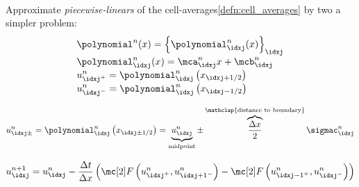 \begin{defnbox}\nospacing
    \begin{defn}\label{defn:approximate_reconstruction}\leavevmode\\
        \begin{minipage}{0.5\textwidth}
            Approximate \textit{piecewise-linears} of the cell-averages\cref{defn:cell_averages} by
            two a simpler problem:
        \begin{align*}
          &\polynomial^{n}(x)=\left\{\polynomial_{\idxj}^{n}(x)\right\}_{\idxj}\\[-1\jot]
          &\polynomial_{\idxj}^{n}(x)=\mca_{\idxj}^{n}x+\mcb_{\idxj}^{n}\\[-1\jot]
          &u_{\idxj^{+}}^{n}=\polynomial_{\idxj}^{n}\left(x_{\idxj+1/2}\right)\\[-1\jot]
          &u_{\idxj^{-}}^{n}=\polynomial_{\idxj}^{n}\left(x_{\idxj-1/2}\right)
        \end{align*}
        \end{minipage}
        \begin{minipage}[c]{0.45\textwidth}
            \begin{figure}[H]
                \centering{
                  \def\svgwidth{100pt}
                  \resizebox{0.85\linewidth}{!}{}
                }
            \end{figure}
        \end{minipage}
    \end{defn}
\end{defnbox}
\begin{corbox}\nospacing
    \begin{cor}
        \begin{align}
          u_{\idxj\pm}^{n}=\polynomial_{\idxj}^{n} \left(x_{\idxj\pm 1/2}\right)=\underbrace{u_{\idxj}^{n}}_{\text{midpoint}}\pm\overbrace{\frac{\Delta x}{2}}^{\mathclap{\text{distance to boundary}}}\sigmac_{\idxj}^{n}\label{eq:linear_reconstruction_approximation}
        \end{align}
    \end{cor}
\end{corbox}
\begin{defnbox}\nospacing
    \begin{defn}\label{defn:fvm_evolution_and_averaging}
        \begin{align}
          u_{\idxj}^{n+1}=u_{\idxj}^{n}-\frac{\Delta t}{\Delta x}
          \left(\Flux \left(u_{\idxj^{+}}^{n},u_{{\idxj+1}^{-}}^{n}\right)-
         \Flux \left(u_{{\idxj-1}^{+}}^{n},u_{{\idxj}^{-}}^{n}\right) \right)\label{eq:evolution_and_averaging}
        \end{align}
    \end{defn}
\end{defnbox}
